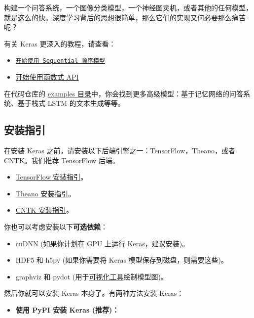 构建一个问答系统，一个图像分类模型，一个神经图灵机，或者其他的任何模型，就是这么的快。深度学习背后的思想很简单，那么它们的实现又何必要那么痛苦呢？

有关 Keras 更深入的教程，请查看：



\begin{itemize}
\tightlist
\item
\hyperref[sequential-model-guide]{\texttt{开始使用 Sequential 顺序模型}}
\item
\hyperref[functional-api-guide]{开始使用函数式 API}
\end{itemize}

在代码仓库的
\href{https://github.com/keras-team/keras/tree/master/examples}{examples
目录}中，你会找到更多高级模型：基于记忆网络的问答系统、基于栈式 LSTM
的文本生成等等。



\subsection{安装指引}\label{ux5b89ux88c5ux6307ux5f15}

在安装 Keras 之前，请安装以下后端引擎之一：TensorFlow，Theano，或者
CNTK。我们推荐 TensorFlow 后端。

\begin{itemize}
\tightlist
\item
  \href{https://www.tensorflow.org/install/}{TensorFlow 安装指引}。
\item
  \href{http://deeplearning.net/software/theano/install.html\#install}{Theano
  安装指引}。
\item
  \href{https://docs.microsoft.com/en-us/cognitive-toolkit/setup-cntk-on-your-machine}{CNTK
  安装指引}。
\end{itemize}

你也可以考虑安装以下\textbf{可选依赖}：

\begin{itemize}
\tightlist
\item
  cuDNN (如果你计划在 GPU 上运行 Keras，建议安装)。
\item
  HDF5 和 h5py (如果你需要将 Keras 模型保存到磁盘，则需要这些)。
\item
  graphviz 和 pydot
  (用于\hyperref[visualization]{可视化工具}绘制模型图)。
\end{itemize}

然后你就可以安装 Keras 本身了。有两种方法安装 Keras：

\begin{itemize}
\tightlist
\item
  \textbf{使用 PyPI 安装 Keras (推荐)：}
\end{itemize}

